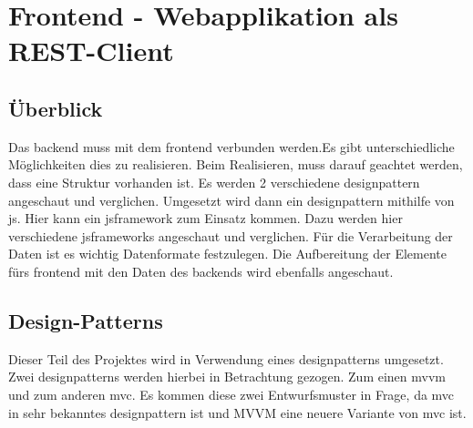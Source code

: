 \section{Frontend - Webapplikation als REST-Client}
\subsection{Überblick}
Das \Gls{backend} muss mit dem \Gls{frontend} verbunden werden.Es gibt unterschiedliche Möglichkeiten dies zu realisieren. Beim Realisieren, muss darauf geachtet werden, dass eine Struktur vorhanden ist. Es werden 2 verschiedene \Gls{designpattern} angeschaut und verglichen. Umgesetzt wird dann ein \Gls{designpattern} mithilfe von \Gls{js}. Hier kann ein \Gls{jsframework} zum Einsatz kommen. Dazu werden hier verschiedene \Gls{jsframework}s angeschaut und verglichen. Für die Verarbeitung der Daten ist es wichtig Datenformate festzulegen. Die Aufbereitung der Elemente fürs \Gls{frontend} mit den Daten des \Gls{backend}s wird ebenfalls angeschaut.
\subsection{Design-Patterns}
Dieser Teil des Projektes wird in Verwendung eines \Gls{designpattern}s umgesetzt. Zwei \Gls{designpattern}s werden hierbei in Betrachtung gezogen. Zum einen \Gls{mvvm} und zum anderen \Gls{mvc}. Es kommen diese zwei Entwurfsmuster in Frage, da \Gls{mvc} in sehr bekanntes \Gls{designpattern} ist und MVVM eine neuere Variante von \Gls{mvc} ist.
